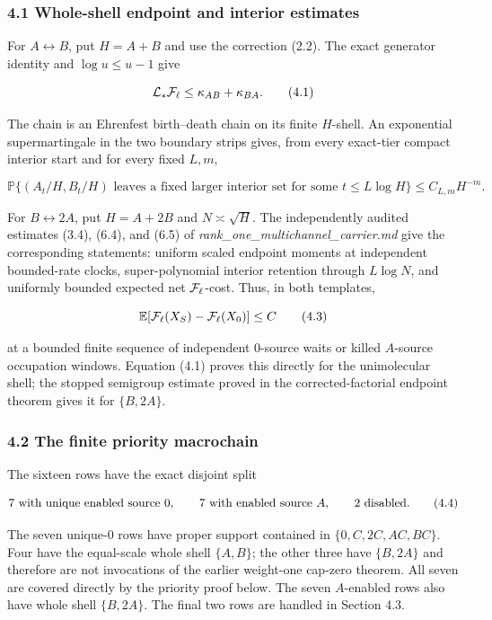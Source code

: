 \subsubsection{4.1 Whole-shell endpoint and interior
estimates}

For \(A\leftrightarrow B\), put \(H=A+B\) and use the correction (2.2).
The exact generator identity and \(\log u\le u-1\) give

\[
 {\cal L}_*{\cal F}_\ell\le\kappa_{AB}+\kappa_{BA}.    \tag{4.1}
\]

The chain is an Ehrenfest birth--death chain on its finite \(H\)-shell.
An exponential supermartingale in the two boundary strips gives, from
every exact-tier compact interior start and for every fixed \(L,m\),

\[
 \mathbb P\{(A_t/H,B_t/H)\text{ leaves a fixed larger interior set}
              \text{ for some }t\le L\log H\}
 \le C_{L,m}H^{-m}.                                    \tag{4.2}
\]

For \(B\leftrightarrow2A\), put \(H=A+2B\) and \(N\asymp\sqrt H\). The
independently audited estimates (3.4), (6.4), and (6.5) of
\emph{rank\_one\_multichannel\_carrier.md} give the corresponding
statements: uniform scaled endpoint moments at independent bounded-rate
clocks, super-polynomial interior retention through \(L\log N\), and
uniformly bounded expected net \({\cal F}_\ell\)-cost. Thus, in both
templates,

\[
 \mathbb E[{\cal F}_\ell(X_S)-{\cal F}_\ell(X_0)]\le C \tag{4.3}
\]

at a bounded finite sequence of independent \(0\)-source waits or killed
\(A\)-source occupation windows. Equation (4.1) proves this directly for
the unimolecular shell; the stopped semigroup estimate proved in the
corrected-factorial endpoint theorem gives it for \(\{B,2A\}\).

\subsubsection{4.2 The finite priority
macrochain}

The sixteen rows have the exact disjoint split

\[
 7\ \hbox{with unique enabled source }0,\qquad
 7\ \hbox{with enabled source }A,\qquad
 2\ \hbox{disabled}.                                  \tag{4.4}
\]

The seven unique-\(0\) rows have proper support contained in
\(\{0,C,2C,AC,BC\}\). Four have the equal-scale whole shell \(\{A,B\}\);
the other three have \(\{B,2A\}\) and therefore are not invocations of
the earlier weight-one cap-zero theorem. All seven are covered directly
by the priority proof below. The seven \(A\)-enabled rows also have
whole shell \(\{B,2A\}\). The final two rows are handled in Section 4.3.


